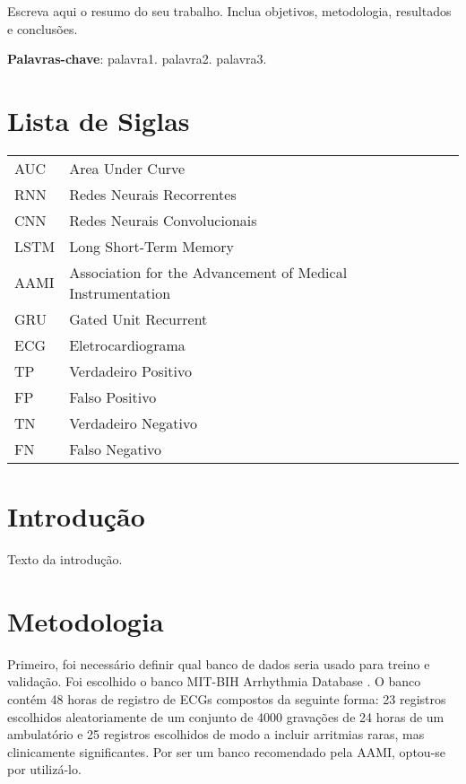 \documentclass[
    12pt,                %
    openright,           %
    oneside,             %
    a4paper,             %
    brazil               %
]{abntex2}
\begin{document}
\imprimircapa
\imprimirfolhaderosto*

\begin{resumo}
Escreva aqui o resumo do seu trabalho.  
Inclua objetivos, metodologia, resultados e conclusões.

\vspace{\onelineskip}
\noindent
\textbf{Palavras-chave}: palavra1. palavra2. palavra3.
\end{resumo}

\tableofcontents

\chapter*{Lista de Siglas} 
\begin{tabular}{ll}
AUC & Area Under Curve \\
RNN & Redes Neurais Recorrentes \\
CNN & Redes Neurais Convolucionais \\
LSTM & Long Short-Term Memory \\
AAMI & Association for the Advancement of Medical Instrumentation   \\
GRU & Gated Unit Recurrent \\
ECG & Eletrocardiograma \\
TP & Verdadeiro Positivo \\
FP & Falso Positivo \\
TN & Verdadeiro Negativo \\
FN & Falso Negativo \\
\end{tabular}



\chapter{Introdução}
Texto da introdução.

\chapter{Metodologia}

Primeiro, foi necessário definir qual banco de dados seria usado para treino e validação. Foi escolhido o banco MIT-BIH Arrhythmia Database \cite{mitbih2005}. O banco contém 48 horas de registro de ECGs compostos da seguinte forma: 23 registros escolhidos aleatoriamente de um conjunto de 4000 gravações de 24 horas de um ambulatório e 25 registros escolhidos de modo a incluir arritmias raras, mas clinicamente significantes. Por ser um banco recomendado pela AAMI, optou-se por utilizá-lo.
\end{document}
